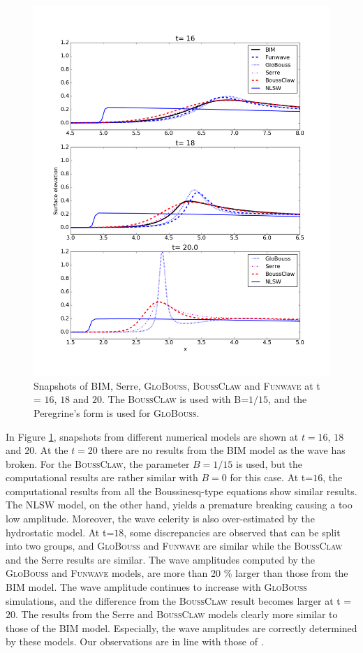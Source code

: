 \documentclass[review]{elsarticle}
\newcommand{\BoussClaw}{\textsc{BoussClaw} }
\newcommand{\BoussClawt}{\textsc{BoussClaw}}
\begin{document}
\begin{figure}[tbh!]
\centering
\includegraphics[width=.7\textwidth]{_fig/bim_boussclaw_fun_glob.png}
\caption{Snapshots of BIM, Serre, \textsc{GloBouss}, \BoussClaw
and \textsc{Funwave} at t = $16$, $18$ and $20$.
The \BoussClaw is used with B=$1/15$,
and the Peregrine's form is used for \textsc{GloBouss}.}
\label{fig:bim_boussclaw_fun}
\end{figure}

In Figure \ref{fig:bim_boussclaw_fun}, snapshots from different
numerical models are shown at $t=16$, $18$ and $20$.
At the $t=20$ there are no results from the BIM model as  the wave has broken.
For the \BoussClawt, the parameter $B=1/15$ is used, 
but the computational results are rather similar with $B=0$
for this case. 
At t=$16$, the computational results
from all the Boussinesq-type equations show similar results.
The NLSW model, on the other hand, yields a premature breaking 
causing a too low amplitude. Moreover, the wave celerity is also over-estimated
by the hydrostatic model. 
At t=$18$, some discrepancies are observed 
that can be split into two groups, and
\textsc{GloBouss} and \textsc{Funwave} 
are similar while the \BoussClaw
and the Serre results are similar. 
The wave amplitudes computed by the \textsc{GloBouss} and \textsc{Funwave} models,
are more than 20 \% 
larger than those from the BIM model.
The wave amplitude continues to increase 
with \textsc{GloBouss} simulations,
and the difference from the \BoussClaw result 
becomes larger at t = $20$. 
The results from the Serre and \BoussClaw models clearly
more similar to those of the BIM model. 
Especially, the wave amplitudes are correctly determined by these models.
Our observations are in line with those of \citet{wei1995fully}.
 
\end{document}
